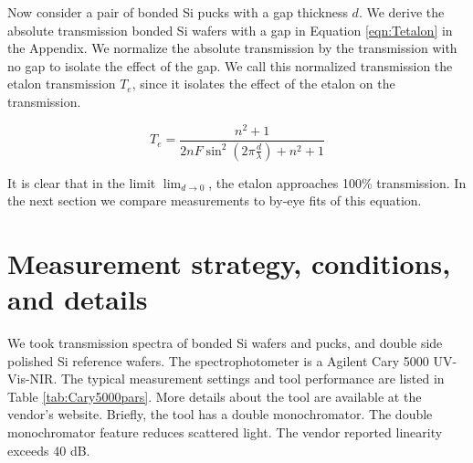 \documentclass[osajnl,preprint,showpacs,superscriptaddress,12pt]{revtex4-1} %
\begin{document}
Now consider a pair of bonded Si pucks with a gap thickness $d$. We derive the absolute transmission bonded Si wafers with a gap in Equation \ref{eqn:Tetalon} in the Appendix.  We normalize the absolute transmission by the transmission with no gap to isolate the effect of the gap.  We call this normalized transmission the etalon transmission $T_{e}$, since it isolates the effect of the etalon on the transmission.

$$T_{e} = \frac{n^2+1}{2 n F \sin ^2(2\pi \frac{d}{\lambda})+n^2+1} \label{eqFP}$$

It is clear that in the limit $\lim_{d \rightarrow 0}$, the etalon approaches 100\% transmission.  In the next section we compare measurements to by-eye fits of this equation.

\section{Measurement strategy, conditions, and details}
We took transmission spectra of bonded Si wafers and pucks, and double side polished Si reference wafers. The spectrophotometer is a Agilent Cary 5000 UV-Vis-NIR.  The typical measurement settings and tool performance are listed in Table \ref{tab:Cary5000pars}.  More details about the tool are available at the vendor's website.  Briefly, the tool has a double monochromator.  The double monochromator feature reduces scattered light.  The vendor reported linearity exceeds 40 dB.  
\end{document}
